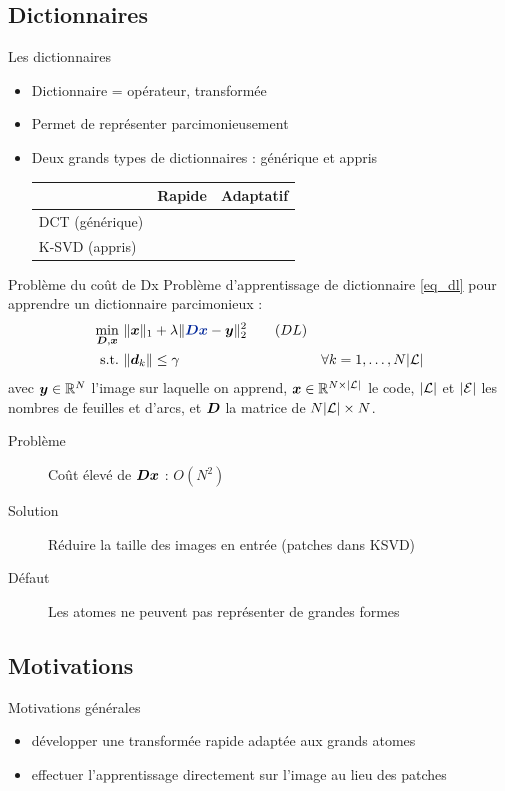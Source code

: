 \subsection{Dictionnaires}
\begin{frame}{Les dictionnaires}
\begin{itemize}
\item Dictionnaire = opérateur, transformée 
\item Permet de représenter parcimonieusement
\item Deux grands types de dictionnaires : \alert{générique} et \alert{appris}
	\begin{table}[] \centering
	\begin{tabular}{@{}lcc@{}} \toprule
	 & Rapide & Adaptatif \\ \midrule
	DCT (générique) & \cmark & \xmark\\
	K-SVD (appris) & \xmark & \cmark \\ \bottomrule
	\end{tabular}
	\end{table}
\end{itemize}
\end{frame}

\begin{frame}{Problème du coût de Dx}
Problème d'apprentissage de dictionnaire \eqref{eq_dl} pour apprendre un dictionnaire parcimonieux :
\begin{align} 
\underset{\D,\x}{\min}~ & \| \x \|_1 + \lambda \| \Beq{\D\x}-\y \|^2_2 \tag{$DL$}\label{eq_dl} \\
\text{s.t.}~ & \| \d_k \| \le \gamma & \forall k = 1,\dots,N|\L| \label{eq_dl_finite_norm} \notag
\end{align}
 avec $\bm{y} \in \mathbb{R}^N$ l'image sur laquelle on apprend, $\bm{x} \in \mathbb{R}^{N \times |\mathcal L|}$ le code, $|\mathcal L|$ et $|\mathcal E|$ les nombres de feuilles et d'arcs, et $\bm{D}$ la matrice de $N|\mathcal L| \times N$.
\begin{description}
	\item[Problème] \alert{Coût élevé} de $\bm{D}\bm{x}$ : $O(N^2)$
	\item[Solution] Réduire la taille des images en entrée (patches dans KSVD)
	\item[Défaut] Les atomes ne peuvent pas représenter de grandes formes
\end{description}
\end{frame}


\subsection{Motivations}
\begin{frame}{Motivations générales}
	\begin{itemize}
		\item développer une \alert{transformée rapide} adaptée aux grands atomes
		\item effectuer l'apprentissage \alert{directement sur l'image} au lieu des patches
	\end{itemize}
\end{frame}







